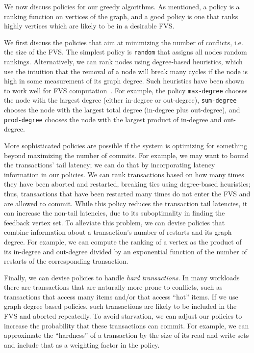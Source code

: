 We now discuss policies for our greedy algorithms. As mentioned, a policy is a ranking function on vertices of the graph, and a good policy is one that ranks highly vertices which are likely to be in a desirable FVS. 

We first discuss the policies that aim at minimizing the number of conflicts, i.e. the size of the FVS. The simplest policy is \texttt{random} that assigns all nodes random rankings. Alternatively, we can rank nodes using degree-based heuristics, which use the intuition that the removal of a node will break many cycles if the node is high in some measurement of its graph degree. Such heuristics have  been shown to work well for FVS computation~\cite{cutello2015targeting}. For example, the policy \texttt{max-degree} chooses the node with the largest degree (either in-degree or out-degree), \texttt{sum-degree} chooses the node with the largest total degree (in-degree plus out-degree), and \texttt{prod-degree} chooses the node with the largest product of in-degree and out-degree. 

More sophisticated policies are possible if the system is optimizing for something beyond maximizing the number of commits. For example, we may want to bound the transactions' tail latency; we can do that by incorporating latency information in our policies. We can rank transactions based on how many times they have been aborted and restarted, breaking ties using degree-based heuristics; thus, transactions that have been restarted many times do not enter the FVS and are allowed to commit. While this policy reduces the transaction tail latencies, it can increase the non-tail latencies, due to its suboptimality in finding the feedback vertex set. To alleviate this problem, we can devise policies that combine information about a transaction's number of restarts and its graph degree. For example, we can compute the ranking of a vertex as the product of its in-degree and out-degree divided by an exponential function of the number of restarts of the corresponding transaction. 

Finally, we can devise policies to handle \emph{hard transactions}. In many workloads there are transactions that are naturally more prone to conflicts, such as transactions that access many items and/or that access ``hot'' items. If we use graph degree based policies, such transactions are likely to be included in the FVS and aborted repeatedly. To avoid starvation, we can adjust our policies to increase the probability that these transactions can commit. For example, we can approximate the ``hardness'' of a transaction by the size of its read and write sets and include that as a weighting factor in the policy. 





